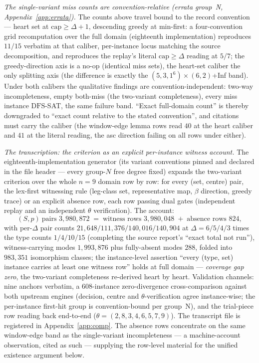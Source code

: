 \emph{The single-variant miss counts are convention-relative (errata group~N,
Appendix~\ref{app:errata}).} The counts above travel bound to the record convention
--- heart set at $\mathrm{cap}\ge\Delta+1$, descending greedy at min-first: a
four-convention grid recomputation over the full domain (eighteenth implementation)
reproduces $11/15$ verbatim at that caliber, per-instance locus matching the source
decomposition, and reproduces the replay's literal $\mathrm{cap}\ge\Delta$ reading
at $5/7$; the greedy-direction axis is a no-op (identical miss sets), the heart-set
caliber the only splitting axis (the difference is exactly the
$(5,3,1^6)\times(6,2)$+Inf band). Under both calibers the qualitative findings are
convention-independent: two-way incompleteness, empty both-miss (the two-variant
completeness), every miss instance $\mathrm{DFS}$-SAT, the same failure band.
``Exact full-domain count'' is thereby downgraded to ``exact count relative to the
stated convention'', and citations must carry the caliber (the window-edge lemma
rows read $40$ at the heart caliber and $41$ at the literal reading, the asc
direction failing on all rows under either).

\emph{The transcription: the criterion as an explicit per-instance witness
account.} The eighteenth-implementation generator (its variant conventions pinned
and declared in the file header --- every group-$N$ free degree fixed) expands the
two-variant criterion over the whole $n=9$ domain row by row: for every (set,
centre) pair, the lex-first witnessing rule (leg-class set, representative map,
$\beta$ direction, greedy trace) or an explicit absence row, each row passing dual
gates (independent replay and an independent $\theta$ verification). The account:
\[
(S,p)\ \text{pairs } 3{,}980{,}872
\;=\; \text{witness rows } 3{,}980{,}048
\;+\; \text{absence rows } 824,
\]
with per-$\Delta$ pair counts $21{,}648/111{,}376/140{,}016/140{,}904$ at
$\Delta=6/5/4/3$ times the type counts $1/4/10/15$ (completing the source report's
``exact total not run''), witness-carrying modes $1{,}993{,}876$ plus fully-absent
modes $288$, folded into $983{,}351$ isomorphism classes; the instance-level
assertion ``every (type, set) instance carries at least one witness row'' holds at
full domain --- \emph{coverage gap zero}, the two-variant completeness re-derived
heart by heart. Validation channels: nine anchors verbatim, a $608$-instance
zero-divergence cross-comparison against both upstream engines (decision, centre
and $\theta$-verification agree instance-wise; the per-instance first-hit group is
convention-bound per group~N), and the trial-piece row reading back end-to-end
($\theta=(2,8,3,4,6,5,7,9)$). The transcript file is registered in
Appendix~\ref{app:comp}. The absence rows concentrate on the same window-edge band
as the single-variant incompleteness --- a machine-account observation, cited as
such --- supplying the row-level material for the unified existence argument below.

